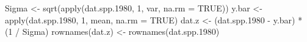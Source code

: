 \begin{Schunk}
\begin{Sinput}
 Sigma <- sqrt(apply(dat.spp.1980, 1, var, na.rm = TRUE))
 y.bar <- apply(dat.spp.1980, 1, mean, na.rm = TRUE)
 dat.z <- (dat.spp.1980 - y.bar) * (1 / Sigma)
 rownames(dat.z) <- rownames(dat.spp.1980)
\end{Sinput}
\end{Schunk}
